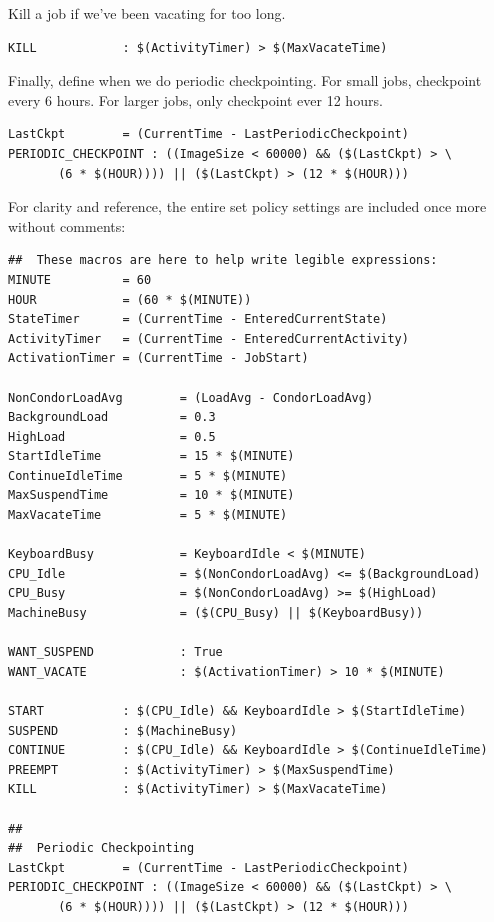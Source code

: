 Kill a job if we've been vacating for too long.
\begin{verbatim}
KILL            : $(ActivityTimer) > $(MaxVacateTime)
\end{verbatim}

Finally, define when we do periodic checkpointing.  For small jobs,
checkpoint every 6 hours.  For larger jobs, only checkpoint ever 12
hours.  
\begin{verbatim}
LastCkpt        = (CurrentTime - LastPeriodicCheckpoint)
PERIODIC_CHECKPOINT : ((ImageSize < 60000) && ($(LastCkpt) > \
       (6 * $(HOUR)))) || ($(LastCkpt) > (12 * $(HOUR))) 
\end{verbatim}

For clarity and reference, the entire set policy settings are included
once more without comments:

\begin{verbatim}
##  These macros are here to help write legible expressions:
MINUTE          = 60
HOUR            = (60 * $(MINUTE))
StateTimer      = (CurrentTime - EnteredCurrentState)
ActivityTimer   = (CurrentTime - EnteredCurrentActivity)
ActivationTimer = (CurrentTime - JobStart)

NonCondorLoadAvg        = (LoadAvg - CondorLoadAvg)
BackgroundLoad          = 0.3
HighLoad                = 0.5
StartIdleTime           = 15 * $(MINUTE)
ContinueIdleTime        = 5 * $(MINUTE)
MaxSuspendTime          = 10 * $(MINUTE)
MaxVacateTime           = 5 * $(MINUTE)

KeyboardBusy            = KeyboardIdle < $(MINUTE)
CPU_Idle                = $(NonCondorLoadAvg) <= $(BackgroundLoad)
CPU_Busy                = $(NonCondorLoadAvg) >= $(HighLoad)
MachineBusy             = ($(CPU_Busy) || $(KeyboardBusy))

WANT_SUSPEND            : True
WANT_VACATE             : $(ActivationTimer) > 10 * $(MINUTE)

START           : $(CPU_Idle) && KeyboardIdle > $(StartIdleTime)
SUSPEND         : $(MachineBusy)
CONTINUE        : $(CPU_Idle) && KeyboardIdle > $(ContinueIdleTime)
PREEMPT         : $(ActivityTimer) > $(MaxSuspendTime)
KILL            : $(ActivityTimer) > $(MaxVacateTime)

##
##  Periodic Checkpointing
LastCkpt        = (CurrentTime - LastPeriodicCheckpoint)
PERIODIC_CHECKPOINT : ((ImageSize < 60000) && ($(LastCkpt) > \
       (6 * $(HOUR)))) || ($(LastCkpt) > (12 * $(HOUR))) 
\end{verbatim}

